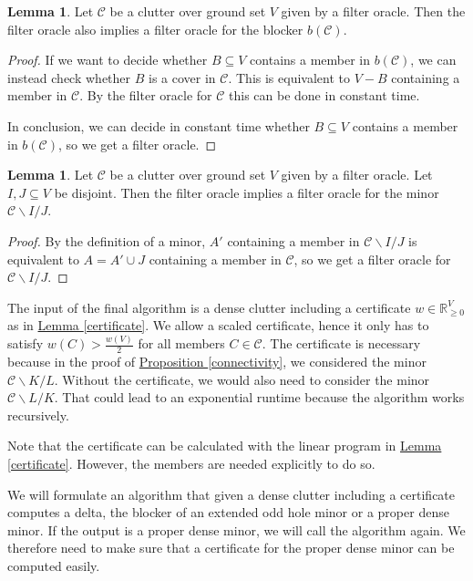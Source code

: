 \documentclass[a4paper, 12pt, twoside=false]{scrbook}
\theoremstyle{definition}
\newtheorem{lemma}[theorem]{Lemma}
\newcommand*{\IR}{\ensuremath{\mathbb{R}}}
\begin{document}
   \begin{lemma}
       Let $\mathcal{C}$ be a clutter over ground set $V$ given by a filter oracle.
       Then the filter oracle also implies a filter oracle for the blocker $b(\mathcal{C})$.
   \end{lemma}

   \begin{proof}
       If we want to decide whether $B \subseteq V$ contains a member in $b(\mathcal{C})$, we can instead check whether $B$ is a cover in $\mathcal{C}$. This is equivalent to $V-B$ containing a member in $\mathcal{C}$. By the filter oracle for $\mathcal{C}$ this can be done in constant time.

       In conclusion, we can decide in constant time whether $B \subseteq V$ contains a member in $b(\mathcal{C})$, so we get a filter oracle.
   \end{proof}

   \begin{lemma}
       Let $\mathcal{C}$ be a clutter over ground set $V$ given by a filter oracle. Let $I,J \subseteq V$ be disjoint.
       Then the filter oracle implies a filter oracle for the minor $\mathcal{C} \backslash I /J$.
   \end{lemma}

   \begin{proof}
       By the definition of a minor, $A'$ containing a member in $\mathcal{C} \backslash I / J$ is equivalent to $A = A' \cup J$ containing a member in $\mathcal{C}$, so we get a filter oracle for $\mathcal{C} \backslash I / J$.
   \end{proof}

   The input of the final algorithm is a dense clutter including a certificate $w \in \IR^V_{\geq 0}$ as in \hyperref[certificate]{Lemma \ref*{certificate}}. We allow a scaled certificate, hence it only has to satisfy $w(C) > \frac {w(V)}{2}$ for all members $C \in \mathcal{C}$. The certificate is necessary because in the proof of \hyperref[connectivity]{Proposition \ref*{connectivity}}, we considered the minor $\mathcal{C} \backslash K / L$. Without the certificate, we would also need to consider the minor $\mathcal{C}\backslash L / K$. That could lead to an exponential runtime because the algorithm works recursively.

   Note that the certificate can be calculated with the linear program in \hyperref[certificate]{Lemma \ref*{certificate}}. However, the members are needed explicitly to do so.

   We will formulate an algorithm that given a dense clutter including a certificate computes a delta, the blocker of an extended odd hole minor or a proper dense minor. If the output is a proper dense minor, we will call the algorithm again. We therefore need to make sure that a certificate for the proper dense minor can be computed easily.
\end{document}
